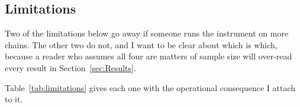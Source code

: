 \subsection{Limitations}
\label{sec:limitations}

Two of the limitations below go away if someone runs the instrument on more chains. The other
two do not, and I want to be clear about which is which, because a reader who assumes all four
are matters of sample size will over-read every result in Section~\ref{sec:Results}.

Table~\ref{tab:limitations} gives each one with the operational consequence I attach to it.

\begingroup
\small

